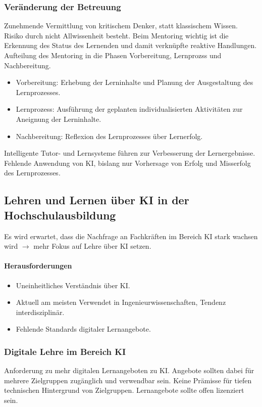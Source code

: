 \subsubsection*{Veränderung der Betreuung}
Zunehmende Vermittlung von kritischem Denker, statt klassischem Wissen. Risiko durch nicht \glqq Allwissenheit\grqq{} besteht. Beim Mentoring wichtig ist die Erkennung des Status des Lernenden und damit verknüpfte reaktive Handlungen. Aufteilung des Mentoring in die Phasen Vorbereitung, Lernprozss und Nachbereitung.
\begin{itemize}
    \item Vorbereitung: Erhebung der Lerninhalte und Planung der Ausgestaltung des Lernprozesses.
    \item Lernprozess: Ausführung der geplanten individualisierten Aktivitäten zur Aneignung der Lerninhalte.
    \item Nachbereitung: Reflexion des Lernprozesses über Lernerfolg.
\end{itemize}
Intelligente Tutor- und Lernsysteme führen zur Verbesserung der Lernergebnisse. Fehlende Anwendung von KI, bislang nur Vorhersage von Erfolg und Misserfolg des Lernprozesses.

\subsection{Lehren und Lernen über KI in der Hochschulausbildung}
Es wird erwartet, dass die Nachfrage an Fachkräften im Bereich KI stark wachsen wird $\rightarrow$ mehr Fokus auf Lehre über KI setzen.

\paragraph*{Herausforderungen}
\begin{itemize}
    \item Uneinheitliches Verständnis über KI.
    \item Aktuell am meisten Verwendet in Ingenieurwissenschaften, Tendenz interdisziplinär.
    \item Fehlende Standards digitaler Lernangebote.
\end{itemize}

\subsubsection*{Digitale Lehre im Bereich KI}
Anforderung zu mehr digitalen Lernangeboten zu KI. Angebote sollten dabei für mehrere Zielgruppen zugänglich und verwendbar sein. Keine Prämisse für tiefen technischen Hintergrund von Zielgruppen. Lernangebote sollte offen lizenziert sein.

